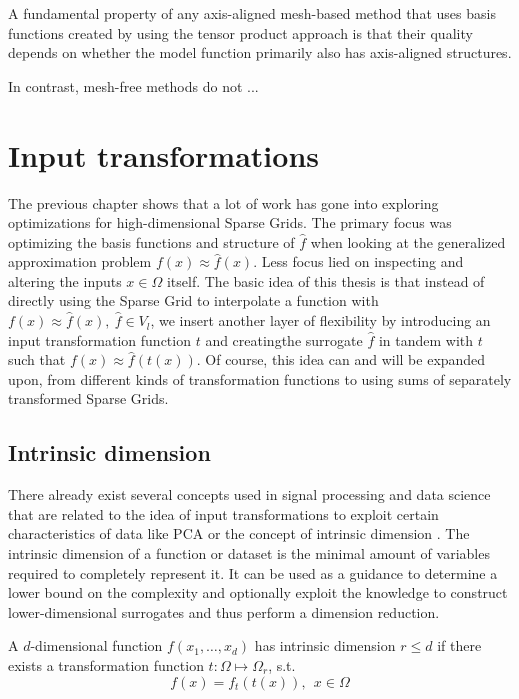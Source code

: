 \documentclass[
  a4paper,  %
  twoside,  %
  bibliography=totoc,
  headsepline,
  cleardoublepage=empty,
  parskip=half,
  draft=false
]{scrbook}
\begin{document}
A fundamental property of any axis-aligned mesh-based method that uses basis functions created by using the tensor product approach is that their quality depends on whether the model function primarily also has axis-aligned structures.

In contrast, mesh-free methods do not ...







\chapter{Input transformations}

The previous chapter shows that a lot of work has gone into exploring optimizations for high-dimensional Sparse Grids.
The primary focus was optimizing the basis functions and structure of $\hat{f}$ when looking at the generalized approximation problem $f(x) \approx \hat{f}(x)$.
Less focus lied on inspecting and altering the inputs $x \in \Omega$ itself.
The basic idea of this thesis is that instead of directly using the Sparse Grid to interpolate a function with $f(x) \approx \hat{f}(x), ~ \hat{f} \in V_l$, we insert another layer of flexibility by introducing an input transformation function $t$ and creatingthe surrogate $\hat{f}$ in tandem with $t$ such that $f(x) \approx \hat{f}(t(x))$.
Of course, this idea can and will be expanded upon, from different kinds of transformation functions to using sums of separately transformed Sparse Grids.


\section{Intrinsic dimension}

There already exist several concepts used in signal processing and data science that are related to the idea of input transformations to exploit certain characteristics of data like PCA \cite{} or the concept of intrinsic dimension \cite{}.
The intrinsic dimension of a function or dataset is the minimal amount of variables required to completely represent it.
It can be used as a guidance to determine a lower bound on the complexity and optionally exploit the knowledge to construct lower-dimensional surrogates and thus perform a dimension reduction.
\begin{definition}
A $d$-dimensional function $f(x_1, \dots, x_d)$ has intrinsic dimension $r \leq d$ if there exists a transformation function $t \colon \Omega \mapsto \Omega_r$, s.t.
\begin{equation}
f(x)=f_t(t(x)), ~~ x \in \Omega
\end{equation}
\end{definition}
\end{document}
